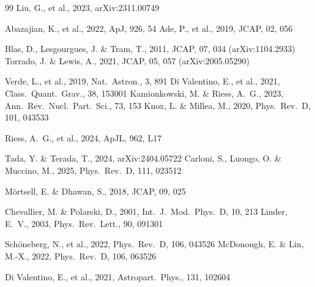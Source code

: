 \documentclass[a4paper,11pt]{article}
\begin{document}
\begin{thebibliography}{99}
 Liu, G., et al., 2023, arXiv:2311.00749

 Abazajian, K., et al., 2022, ApJ, 926, 54
 Ade, P., et al., 2019, JCAP, 02, 056

 Blas, D., Lesgourgues, J. \& Tram, T., 2011, JCAP, 07, 034 (arXiv:1104.2933)
 Torrado, J. \& Lewis, A., 2021, JCAP, 05, 057 (arXiv:2005.05290)

 Verde, L., et al., 2019, Nat.\ Astron., 3, 891
 Di Valentino, E., et al., 2021, Class.\ Quant.\ Grav., 38, 153001
 Kamionkowski, M. \& Riess, A.~G., 2023, Ann.\ Rev.\ Nucl.\ Part.\ Sci., 73, 153
 Knox, L. \& Millea, M., 2020, Phys.\ Rev.\ D, 101, 043533

 Riess, A.~G., et al., 2024, ApJL, 962, L17

 Tada, Y. \& Terada, T., 2024, arXiv:2404.05722
 Carloni, S., Luongo, O. \& Muccino, M., 2025, Phys.\ Rev.\ D, 111, 023512

 M\"{o}rtsell, E. \& Dhawan, S., 2018, JCAP, 09, 025

 Chevallier, M. \& Polarski, D., 2001, Int.\ J.\ Mod.\ Phys.\ D, 10, 213
 Linder, E.~V., 2003, Phys.\ Rev.\ Lett., 90, 091301

 Sch\"{o}neberg, N., et al., 2022, Phys.\ Rev.\ D, 106, 043526
 McDonough, E. \& Lin, M.-X., 2022, Phys.\ Rev.\ D, 106, 063526

 Di Valentino, E., et al., 2021, Astropart.\ Phys., 131, 102604

\end{thebibliography}
\end{document}
